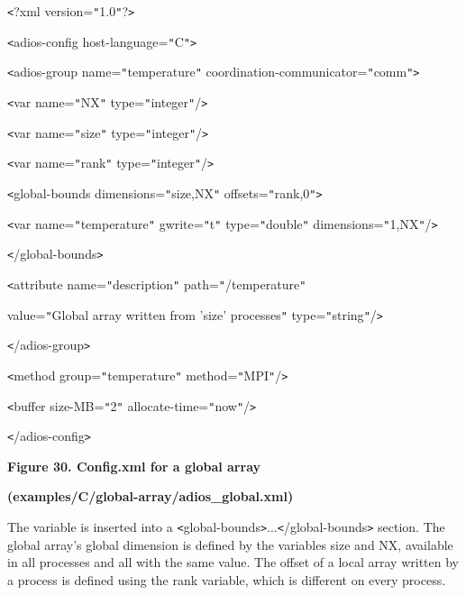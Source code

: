\texttt{<}?xml version=\texttt{"}1.0\texttt{"}?\texttt{>}

\texttt{<}adios-config host-language=\texttt{"}C\texttt{"}\texttt{>}

\parindent=14pt
\texttt{<}adios-group name=\texttt{"}temperature\texttt{"} coordination-communicator=\texttt{"}comm\texttt{"}\texttt{>}

\parindent=28pt
\texttt{<}var name=\texttt{"}NX\texttt{"} type=\texttt{"}integer\texttt{"}/\texttt{>}

\texttt{<}var name=\texttt{"}size\texttt{"} type=\texttt{"}integer\texttt{"}/\texttt{>}

\parindent=57pt
\texttt{<}var name=\texttt{"}rank\texttt{"} type=\texttt{"}integer\texttt{"}/\texttt{>}

\parindent=0pt
{\color{color02} \texttt{<}global-bounds dimensions=\texttt{"}size,NX\texttt{"} 
offsets=\texttt{"}rank,0\texttt{"}\texttt{>}}

\parindent=7pt
{\color{color02} \texttt{<}var name=\texttt{"}temperature\texttt{"} gwrite=\texttt{"}t\texttt{"} 
type=\texttt{"}double\texttt{"} dimensions=\texttt{"}1,NX\texttt{"}/\texttt{>}}

\parindent=0pt
{\color{color02} \texttt{<}/global-bounds\texttt{>}}

\parindent=28pt
\texttt{<}attribute name=\texttt{"}description\texttt{"} path=\texttt{"}/temperature\texttt{"}

\parindent=72pt
value=\texttt{"}Global array written from 'size' processes\texttt{"} type=\texttt{"}string\texttt{"}/\texttt{>}

\parindent=14pt
\texttt{<}/adios-group\texttt{>}

\parindent=0pt
\texttt{<}method group=\texttt{"}temperature\texttt{"} method=\texttt{"}MPI\texttt{"}/\texttt{>}

\texttt{<}buffer size-MB=\texttt{"}2\texttt{"} allocate-time=\texttt{"}now\texttt{"}/\texttt{>}

\texttt{<}/adios-config\texttt{>} 

\label{HRef119581446}\label{HToc144350189}

\begin{center}
{\color{color20} \textbf{Figure 30. Config.xml for a global array }}

{\color{color20} \textbf{(examples/C/global-array/adios\_global.xml)\label{HToc212017568}\label{HToc212017704}}}
\end{center}

The variable is inserted into a \texttt{<}global-bounds\texttt{>}...\texttt{<}/global-bounds\texttt{>} 
section. The global array's global dimension is defined by the variables size and 
NX, available in all processes and all with the same value. The offset of a local 
array written by a process is defined using the rank variable, which is different 
on every process.

